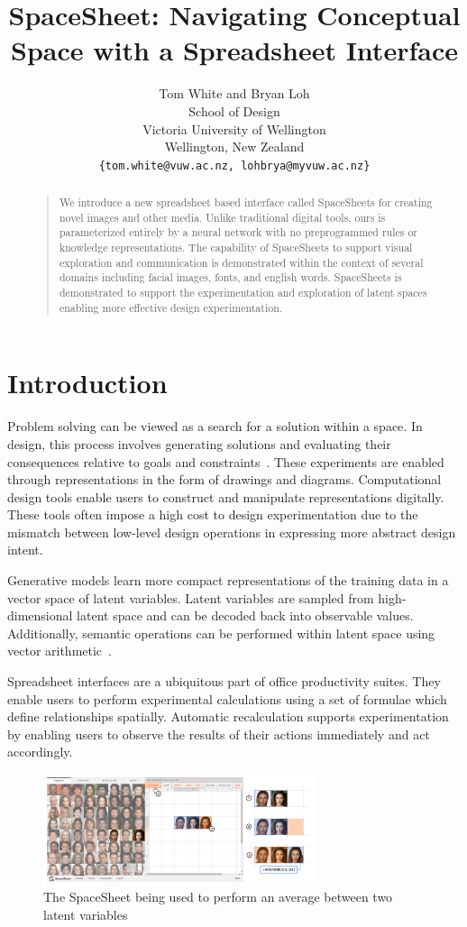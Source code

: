 \documentclass[letterpaper]{article}
\title{SpaceSheet: Navigating Conceptual Space with a Spreadsheet Interface}
\author{
  Tom White and Bryan Loh\\
  School of Design\\Victoria University of Wellington\\Wellington, New Zealand \\
  \texttt{\{tom.white@vuw.ac.nz, lohbrya@myvuw.ac.nz\}} \\
}
\begin{document}
 
\maketitle
\begin{abstract}
\begin{quote}
We introduce a new spreadsheet based interface called SpaceSheets for creating novel images and other media. Unlike traditional digital tools, ours is parameterized entirely by a neural network with no preprogrammed rules or knowledge representations. The capability of SpaceSheets to support visual exploration and communication is demonstrated within the context of several domains including facial images, fonts, and english words. SpaceSheets is demonstrated to support the experimentation and exploration of latent spaces enabling more effective design experimentation.
\end{quote}
\end{abstract}

\section{Introduction}

Problem solving can be viewed as a search for a solution within a space. In design, this process involves generating solutions and evaluating their consequences relative to goals and constraints~\cite{simon95}. These experiments are enabled through representations in the form of drawings and diagrams. Computational design tools enable users to construct and manipulate representations digitally. These tools often impose a high cost to design experimentation due to the mismatch between low-level design operations in expressing more abstract design intent.

Generative models learn more compact representations of the training data in a vector space of latent variables. Latent variables are sampled from high-dimensional latent space and can be decoded back into observable values. Additionally, semantic operations can be performed within latent space using vector arithmetic~\cite{white16}.

Spreadsheet interfaces are a ubiquitous part of office productivity suites. They enable users to perform experimental calculations using a set of formulae which define relationships spatially. Automatic recalculation supports experimentation by enabling users to observe the results of their actions immediately and act accordingly.

\begin{figure}[ht]
  \centering
  \includegraphics[width=8cm]{figs/01-hero-diagram.png}
  \caption{The SpaceSheet being used to perform an average between two latent variables}
\end{figure}
\end{document}
